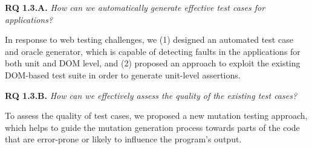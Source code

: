 {\bf RQ 1.3.A.} \emph{How can we automatically generate effective test cases for \javascript applications?}

In response to web testing challenges, we (1) designed an automated test case and oracle generator, which is capable of detecting faults
in the \javascript applications for both unit and DOM level, and (2) proposed an approach to exploit the existing DOM-based test suite in order to generate unit-level assertions. 

{\bf RQ 1.3.B.} \emph{How can we effectively assess the quality of the existing \javascript test cases?}

To assess the quality of test cases, we proposed a new \javascript mutation testing approach, which helps to guide the
mutation generation process towards parts of the code that are error-prone or likely to influence the program's output.

